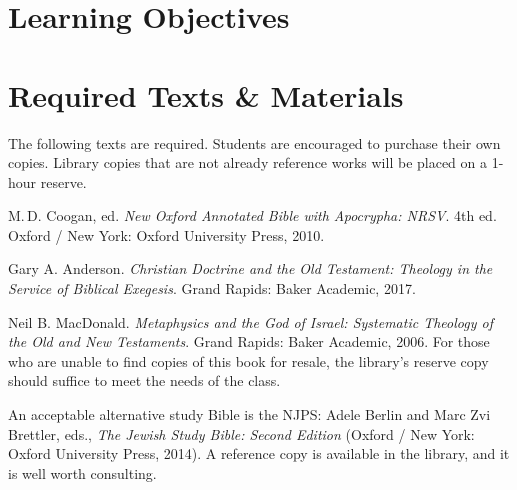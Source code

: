 \documentclass[titlepage]{article}
\newcommand\incl{../includes}
\begin{document}


\section{Learning Objectives}
\label{objectives}
\edobject

\section{Required Texts \& Materials}
\label{texts}

The following texts are required. Students are encouraged to purchase
their own copies. Library copies that are not already reference works
will be placed on a 1-hour reserve.

\begingroup
\renewcommand{\section}[2]{}%
\begin{thebibliography}{MacDonald}%

	 M.\,D. Coogan, ed.
    \emph{New Oxford Annotated Bible with Apocrypha: NRSV}. 4th ed.
    Oxford / New York: Oxford University Press, 2010.

	 Gary A. Anderson.
	\emph{Christian Doctrine and the Old Testament: Theology in the Service of Biblical Exegesis}.
	Grand Rapids: Baker Academic, 2017.

	 Neil B. MacDonald.
	\emph{Metaphysics and the God of Israel: Systematic Theology of the Old and New Testaments}.
	Grand Rapids: Baker Academic, 2006.
	For those who are unable to find copies of this book for resale, the library's reserve copy should suffice to meet the needs of the class.


\end{thebibliography}
\endgroup

An acceptable alternative study Bible is the NJPS: Adele Berlin and Marc
Zvi Brettler, eds., \emph{The Jewish Study Bible: Second Edition}
(Oxford / New York: Oxford University Press, 2014). A reference copy is
available in the library, and it is well worth consulting.
\end{document}
